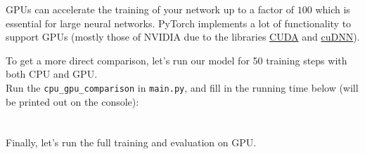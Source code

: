 GPUs can accelerate the training of your network up to a factor of $100$ which is essential for large neural networks. PyTorch implements a lot of functionality to support GPUs (mostly those of NVIDIA due to the libraries \href{https://developer.nvidia.com/cuda-zone}{CUDA} and \href{https://developer.nvidia.com/cudnn}{cuDNN}). 

To get a more direct comparison, let's run our model for 50 training steps with both CPU and GPU.\\

\noindent\todo{} Run the \texttt{cpu\_gpu\_comparison} in \texttt{main.py}, and fill in the running time below (will be printed out on the console):\\
\noindent{}
\\\\
\noindent Finally, let's run the full training and evaluation on GPU.\\

